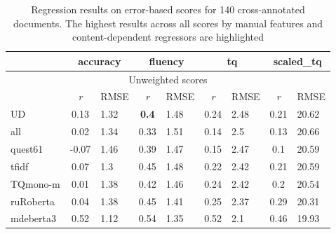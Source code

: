 \begin{table}[H]
	\centering
	\begin{tabular}{l|cl|cl|cl|cl}
		\toprule
		& \multicolumn{2}{c|}{accuracy} & \multicolumn{2}{c|}{\textbf{fluency}}  & \multicolumn{2}{c|}{tq} & \multicolumn{2}{c}{scaled\_tq}    \\
		\midrule
		\multicolumn{9}{c}{Unweighted scores} \\
		\midrule
		& \textit{r}        & RMSE & \textit{r}       & RMSE & \textit{r}    & RMSE & \textit{r}    & RMSE  \\
		\midrule
		UD                & 0.13  & 1.32 & \textbf{0.4}     & 1.48 & 0.24  & 2.48 & 0.21       & 20.62 \\
		all               & 0.02  & 1.34 & 0.33    & 1.51 & 0.14  & 2.5  & 0.13       & 20.66 \\
		quest61           & -0.07 & 1.46 & 0.39    & 1.47 & 0.15  & 2.47 & 0.1        & 20.59 \\
		\midrule
		tfidf             & 0.07  & 1.3  & 0.45    & 1.48 & 0.22  & 2.42 & 0.21       & 20.59 \\
		TQmono-m          & 0.01  & 1.38 & 0.42    & 1.46 & 0.24  & 2.42 & 0.2        & 20.54 \\
		ruRoberta   & 0.04  & 1.38 & 0.45    & 1.41 & 0.25  & 2.37 & 0.29       & 20.31 \\
		mdeberta3    & 0.52  & 1.12 & \boxit{0.3in}0.54    & 1.35 & 0.52  & 2.1  & 0.46       & 19.93 \\
		\bottomrule
	\end{tabular}
	\caption{\label{tab:err140_res}Regression results on error-based scores for 140 cross-annotated documents. The highest results across all scores by manual features and content-dependent regressors are highlighted}
\end{table}

